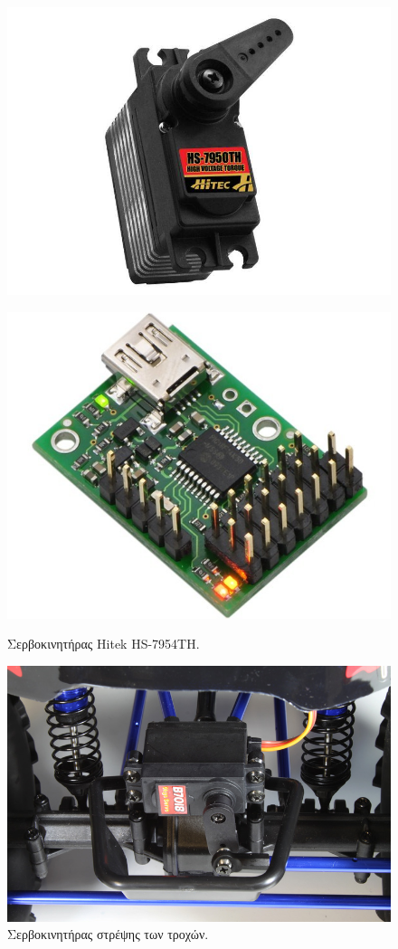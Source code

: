 \begin{figure}[!ht]
	\begin{minipage}[t]{.49\textwidth}		
		\centering
		\includegraphics[width=0.5\linewidth]{Chapters/Chapter2/Figures/hitek_servo.jpg}
		\caption{Σερβοκινητήρας Hitek HS-7954TH.}
		\label{fig:hitek_servo}
	\end{minipage}
	\begin{minipage}[t]{.5\textwidth}
 	\centering
		\includegraphics[width=0.5\linewidth]{Chapters/Chapter2/Figures/pololu_maestro.jpg}
		\label{fig:pololu_maestro}
	\end{minipage}
\end{figure}

\begin{figure}[!ht]
		\centering
		\includegraphics[width=0.5\linewidth]{Chapters/Chapter2/Figures/steering_servo.jpg}
		\caption{Σερβοκινητήρας στρέψης των τροχών.}
		\label{fig:servo_steering}
\end{figure}


